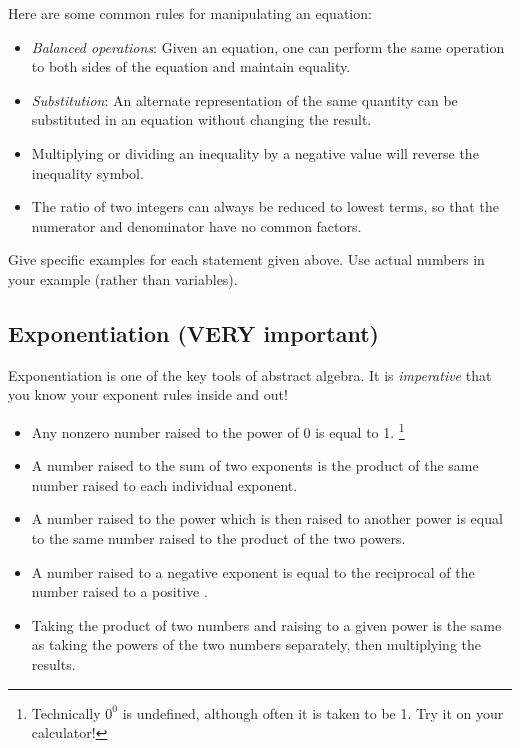 Here are some common rules for manipulating an equation:

\begin {itemize}
\item
\emph{Balanced operations}: Given an equation, one can perform the same operation to both sides of the equation and maintain equality.  
\item
\emph{Substitution}: An alternate representation of the same quantity can be substituted in an equation without changing the result. 
\item
Multiplying or dividing an inequality by a negative value will reverse the inequality symbol.
\item
The ratio of two integers can always be reduced to lowest terms, so that the numerator and denominator have no common factors.
\end {itemize}
\begin{exercise}\label{exercise:BeforeWeBegin:4}
Give specific examples for each statement  given above. Use actual numbers in your example (rather than variables).
\end{exercise}


%
%

\subsection {Exponentiation (VERY important)}

Exponentiation is one of the key tools of abstract algebra. It is \emph{imperative} that you know your exponent rules inside and out!  

\begin{itemize}
\item
Any nonzero number raised to the power of 0 is equal to 1.
\footnote{ Technically $0^0$ is undefined, although often it is taken to be 1. Try it on your calculator!}
\item
A number raised to the sum of two exponents  is the product of the same number raised to each individual exponent.
\item
A number raised to the power which is then raised to another power is equal to the same number raised to the product of the two powers.
\item
A number raised to a negative exponent is equal to the reciprocal of the number  raised to a positive .
\item
Taking the  product of two numbers  and raising to a given power is the same as taking the powers of the two numbers separately, then multiplying the results.
\end{itemize}

